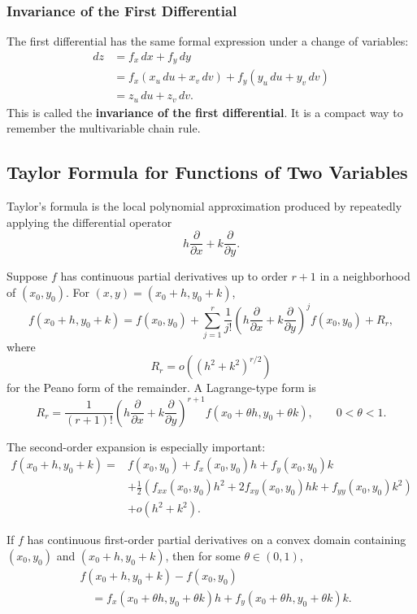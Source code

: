 \subsubsection{Invariance of the First Differential}

The first differential has the same formal expression under a change of variables:
\[
\begin{aligned}
    dz&=f_x\,dx+f_y\,dy\\
      &=f_x(x_u\,du+x_v\,dv)+f_y(y_u\,du+y_v\,dv)\\
      &=z_u\,du+z_v\,dv.
\end{aligned}
\]
This is called the \textbf{invariance of the first differential}. It is a compact way to remember the multivariable chain rule.

\subsection{Taylor Formula for Functions of Two Variables}

Taylor's formula is the local polynomial approximation produced by repeatedly applying the differential operator
\[
    h\frac{\partial}{\partial x}+k\frac{\partial}{\partial y}.
\]

\begin{theorem}
Suppose $f$ has continuous partial derivatives up to order $r+1$ in a neighborhood of $(x_0,y_0)$. For $(x,y)=(x_0+h,y_0+k)$,
\[
    f(x_0+h,y_0+k)
    =f(x_0,y_0)+\sum_{j=1}^{r}\frac{1}{j!}
    \left(h\frac{\partial}{\partial x}+k\frac{\partial}{\partial y}\right)^j f(x_0,y_0)+R_r,
\]
where
\[
    R_r=o\left((h^2+k^2)^{r/2}\right)
\]
for the Peano form of the remainder. A Lagrange-type form is
\[
    R_r=\frac{1}{(r+1)!}
    \left(h\frac{\partial}{\partial x}+k\frac{\partial}{\partial y}\right)^{r+1}
    f(x_0+\theta h,y_0+\theta k),\qquad 0<\theta<1.
\]
\end{theorem}

The second-order expansion is especially important:
\[
\begin{aligned}
    f(x_0+h,y_0+k)=&f(x_0,y_0)+f_x(x_0,y_0)h+f_y(x_0,y_0)k\\
    &+\frac12\left(f_{xx}(x_0,y_0)h^2+2f_{xy}(x_0,y_0)hk+f_{yy}(x_0,y_0)k^2\right)\\
    &+o(h^2+k^2).
\end{aligned}
\]

\begin{theorem}
If $f$ has continuous first-order partial derivatives on a convex domain containing $(x_0,y_0)$ and $(x_0+h,y_0+k)$, then for some $\theta\in(0,1)$,
\[
\begin{aligned}
&f(x_0+h,y_0+k)-f(x_0,y_0)\\
&\quad=f_x(x_0+\theta h,y_0+\theta k)h+f_y(x_0+\theta h,y_0+\theta k)k.
\end{aligned}
\]
\end{theorem}

